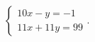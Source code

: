 $\displaystyle
\left\{
\begin{array}{l}
\displaystyle 10 x - y = -1 \\
\displaystyle 11 x + 11 y = 99
\end{array}
\right.
$.
